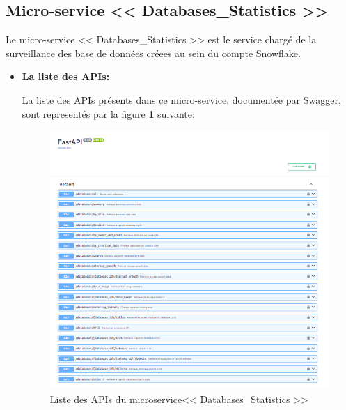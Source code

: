 \subsection{Micro-service << Databases\_Statistics >>}
\par Le micro-service << Databases\_Statistics >> est le service chargé de la surveillance des base de données créees au sein du compte Snowflake.
\begin{itemize}
    \item \textbf{La liste des APIs:}
        \par La liste des APIs présents dans ce micro-service, documentée par Swagger, sont representés par la figure \textbf{\ref{fig:apiData}} suivante:
        \begin{figure}[H]
            \centering
            \includegraphics[width =1\linewidth]{img/captures/database_apis.PNG}
            \caption{Liste des APIs du microservice<< Databases\_Statistics >> }
                \label{fig:apiData}
        \end{figure}


\end{itemize}
